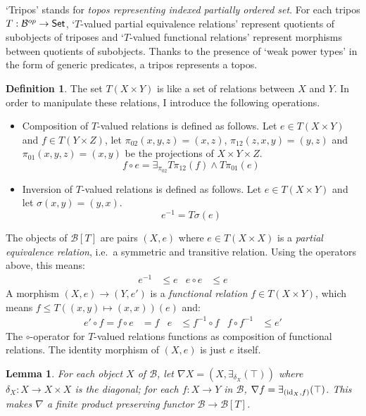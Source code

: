 \documentclass[sort&compress]{elsarticle}
\theoremstyle{plain}
\newtheorem{lemma}[theorem]{Lemma}
\theoremstyle{definition}
\newtheorem{defin}[theorem]{Definition}
\theoremstyle{remark}
\newcommand\hide[1]{}
\newcommand\cat\mathcal
\begin{document}
`Tripos' stands for \emph{topos representing indexed partially ordered set}. For each tripos $T:\cat B\dual \to \Set$, `$T$-valued partial equivalence relations' represent quotients of subobjects of triposes and `$T$-valued functional relations' represent morphisms between quotients of subobjects. Thanks to the presence of `weak power types' in the form of generic predicates, a tripos represents a topos.

\newcommand\inv{^{-1}}
\newcommand\im{\exists_}
\begin{defin} The set $T(X\times Y)$ is like a set of relations between $X$ and $Y$. In order to manipulate these relations, I introduce the following operations.
\begin{itemize}
\item Composition of $T$-valued relations is defined as follows. Let $e\in T(X\times Y)$ and $f\in T(Y\times Z)$, let $\pi_{02}(x,y,z) = (x,z)$, $\pi_{12}(z,x,y) = (y,z)$ and $\pi_{01}(x,y,z) = (x,y)$ be the projections of $X\times Y\times Z$.
\[ f\circ e = \im{\pi_{02}} T\pi_{12}(f)\land T\pi_{01}(e) \]
\item Inversion of $T$-valued relations is defined as follows. Let $e\in T(X\times Y)$ and let $\sigma(x,y) = (y,x)$. 
\[ e\inv = T\sigma(e) \]
\end{itemize}

The objects of $\cat B[T]$ are pairs $(X,e)$ where $e\in T(X\times X)$ is a \emph{partial equivalence relation}, i.e.\ a symmetric and transitive relation. Using the operators above, this means:
\begin{align*} e\inv &\leq e & e\circ e &\leq e \end{align*}
A morphism $(X,e) \to (Y,e')$ is a \emph{functional relation} $f\in T(X\times Y)$, which means $f\leq T((x,y)\mapsto (x,x))(e)$ and:
\begin{align*}
e'\circ  f = f \circ e &= f &
e &\leq f\inv \circ f &
f\circ f\inv &\leq e' 
\end{align*}
The $\circ$-operator for $T$-valued relations functions as composition of functional relations. The identity morphism of $(X,e)$ is just $e$ itself.
\end{defin}

\hide{ $f(x,y)  = \exists_z f(z,y)\land e(z,x)$ geeft $f(x,y) \leq e(x,x)$? Als het waar is, dan is het niet triviaal. }

\begin{lemma} For each object $X$ of $\cat B$, let $\nabla X = (X,\im{\delta_X}(\top))$ where $\delta_X:X\to X\times X$ is the diagonal; for each $f:X\to Y$ in $\cat B$, $\nabla f = \im{(\id_X,f)}(\top)$. This makes $\nabla$ a finite product preserving functor $\cat B \to \cat B[T]$.%
\end{lemma}
\end{document}
